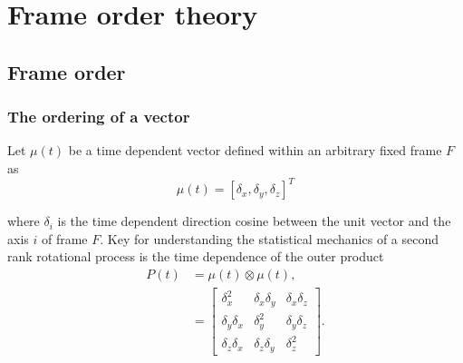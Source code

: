
\section{Frame order theory}





\subsection{Frame order}





\subsubsection{The ordering of a vector}

Let $\mu(t)$ be a time dependent vector defined within an arbitrary fixed frame $F$ as
\begin{equation}
    \mu(t) = \left[ \delta_x, \delta_y, \delta_z \right]^T
\end{equation}

where $\delta_i$ is the time dependent direction cosine between the unit vector and the axis $i$ of frame $F$.
Key for understanding the statistical mechanics of a second rank rotational process is the time dependence of the outer product
\begin{align}
    P(t) &= \mu(t) \otimes \mu(t) , \label{eq: time dependent vector outer product} \\
            &= \begin{bmatrix}
                \delta_x^2       & \delta_x\delta_y & \delta_x\delta_z \\
                \delta_y\delta_x & \delta_y^2       & \delta_y\delta_z \\
                \delta_z\delta_x & \delta_z\delta_y & \delta_z^2
               \end{bmatrix} .
\end{align}

